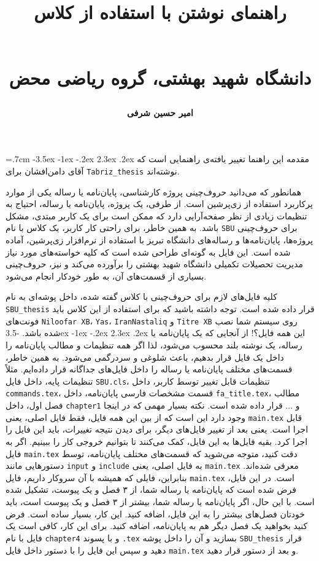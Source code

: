 \documentclass[a4paper,12pt]{article}
\title{راهنمای  نوشتن \پ با استفاده از کلاس
\lr{SBU\_thesis} 
\author{\textbf{امیر حسین شرفی}
}\\
{\small دانشگاه شهید بهشتی، گروه ریاضی محض}
}
\date{}
\makeatletter
\renewcommand\section{\@startsection {section}{1}{\z@}%
                                   {-3.5ex \@plus -1ex \@minus -.2ex}%
                                   {2.3ex \@plus.2ex}%
                                   {\normalfont\large\bfseries}}
\newcommand{\پ}{پروژه/پایان‌نامه/رساله }
\makeatother
\begin{document}
\maketitle
\baselineskip=.7cm
\tableofcontents
\newpage
\section{مقدمه}
این راهنما تغییر یافته‌ی راهنمایی است که آقای دامن‌افشان برای
\verb!Tabriz_thesis!
 نوشته‌اند.

همانطور که می‌دانید حروف‌چینی پروژه کارشناسی، پایان‌نامه یا رساله یکی از موارد پرکاربرد استفاده از زی‌پرشین است. از طرفی، یک پروژه، پایان‌نامه یا رساله،  احتیاج به تنظیمات زیادی از نظر صفحه‌آرایی  دارد که ممکن است برای
یک کاربر مبتدی، مشکل باشد. به همین خاطر، برای راحتی کار کاربر، یک کلاس با نام 
\verb!SBU!
 برای حروف‌چینی پروژه‌ها، پایان‌نامه‌ها و رساله‌های دانشگاه تبریز با استفاده از نرم‌افزار زی‌پرشین،  آماده شده است. این فایل به 
گونه‌ای طراحی شده است که کلیه خواسته‌های مورد نیاز  مدیریت تحصیلات تکمیلی دانشگاه شهید بهشتی را برآورده می‌کند و نیز، حروف‌چینی بسیاری
از قسمت‌های آن، به طور خودکار انجام می‌شود.

کلیه فایل‌های لازم برای حروف‌چینی با کلاس گفته شده، داخل پوشه‌ای به نام
\verb!SBU_thesis!
  قرار داده شده است. توجه داشته باشید که برای استفاده از این کلاس باید فونت‌های
  \verb!Niloofar XB!،
 \verb!Yas!،
  \verb!IranNastaliq!
  و
    \verb!Titre XB!
    روی سیستم شما نصب شده باشد.
\section{این همه فایل؟!}\label{sec2}
از آنجایی که یک پایان‌نامه یا رساله، یک نوشته بلند محسوب می‌شود، لذا اگر همه تنظیمات و مطالب پایان‌نامه را داخل یک فایل قرار بدهیم، باعث شلوغی
و سردرگمی می‌شود. به همین خاطر، قسمت‌های مختلف پایان‌نامه یا رساله را داخل فایل‌های جداگانه قرار داده‌ایم. مثلاً تنظیمات پایه، داخل فایل
\verb!SBU.cls!، 
تنظیمات قابل تغییر توسط کاربر، داخل 
\verb!commands.tex!،
قسمت مشخصات فارسی پایان‌نامه، داخل 
\verb!fa_title.tex!،
مطالب فصل اول، داخل 
\verb!chapter1!
و ... قرار داده شده است. نکته بسیار مهمی که در اینجا وجود دارد این است که از بین این همه فایل، فقط فایل اصلی، یعنی
\verb!main.tex!
قابل اجرا است. یعنی بعد از تغییر فایل‌های دیگر، برای دیدن نتیجه تغییرات، باید این فایل را اجرا کرد. بقیه فایل‌ها به این فایل، کمک می‌کنند تا بتوانیم خروجی کار را ببینیم. اگر به فایل 
\verb!main.tex!
دقت کنید، متوجه می‌شوید که قسمت‌های مختلف پایان‌نامه، توسط دستورهایی مانند 
\verb!input!
و
\verb!include!
به فایل اصلی، یعنی 
\verb!main.tex!
معرفی شده‌اند. بنابراین، فایلی که همیشه با آن سروکار داریم، فایل 
\verb!main.tex!
است.
در این فایل، فرض شده است که پایان‌نامه یا رساله شما، از ۳ فصل و یک پیوست، تشکیل شده است. با این حال، اگر
  پایان‌نامه یا رساله شما، بیشتر از ۳ فصل و یک پیوست است، باید خودتان فصل‌های بیشتر را به این فایل، اضافه کنید. این کار، بسیار ساده است. فرض کنید بخواهید یک فصل دیگر هم به پایان‌نامه، اضافه کنید. برای این کار، کافی است یک فایل با نام 
\verb!chapter4!
و با پسوند 
\verb!.tex!
بسازید و آن را داخل پوشه 
\verb!SBU_thesis!
قرار دهید و سپس این فایل را با دستور 
\verb!!
داخل فایل
\verb!main.tex!
و بعد از دستور
\verb!!
 قرار دهید.
\end{document}
